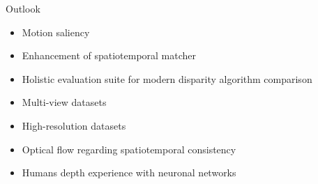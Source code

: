 \documentclass[10pt]{beamer}
\begin{document}
\begin{frame}[fragile]{Outlook}
  \begin{itemize}
    \item Motion saliency
    \item Enhancement of spatiotemporal matcher
    \item Holistic evaluation suite for modern disparity algorithm comparison
    \item Multi-view datasets
    \item High-resolution datasets
    \item Optical flow regarding spatiotemporal consistency
    \item Humans depth experience with neuronal networks
  \end{itemize}
\end{frame}

\end{document}
